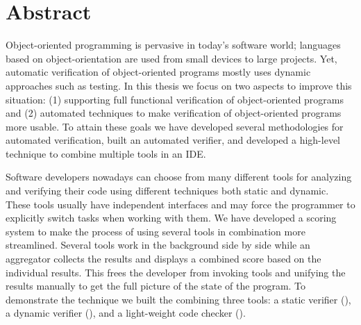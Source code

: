 \chapter*{Abstract}




Object-oriented programming is pervasive in today's software world; languages based on object-orientation are used from small devices to large projects.
Yet, automatic verification of object-oriented programs mostly uses dynamic approaches such as testing.
In this thesis we focus on two aspects to improve this situation: (1) supporting full functional verification of object-oriented programs and (2) automated techniques to make verification of object-oriented programs more usable. To attain these goals we have developed several methodologies for automated verification, built an automated verifier, and developed a high-level technique to combine multiple tools in an IDE.

Software developers nowadays can choose from many different tools for analyzing and verifying their code using different techniques both static and dynamic.
These tools usually have independent interfaces and may force the programmer to explicitly switch tasks when working with them.
We have developed a scoring system to make the process of using several tools in combination more streamlined.
Several tools work in the background side by side while an aggregator collects the results and displays a combined score based on the individual results.
This frees the developer from invoking tools and unifying the results manually to get the full picture of the state of the program.
To demonstrate the technique we built the \VAssist combining three tools: a static verifier (\AutoProof), a dynamic verifier (\AutoTest), and a light-weight code checker (\Inspector).

